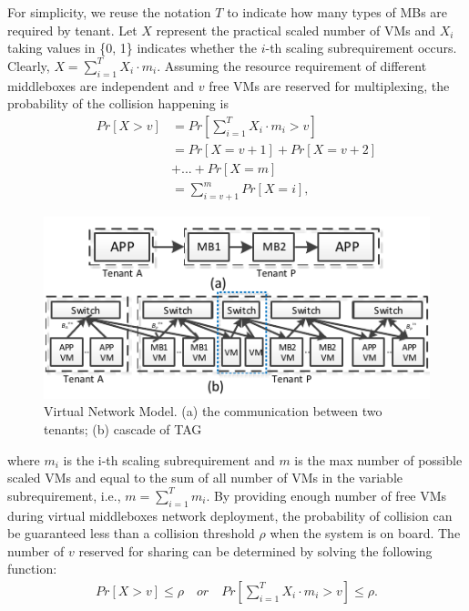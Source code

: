 \documentclass[review]{elsarticle}
\begin{document}
For simplicity, we reuse the notation $T$ to indicate how many types of MBs are required by tenant. Let $X$ represent the practical scaled  number of VMs and $X_{i}$ taking values in \{0, 1\} indicates whether the $i$-th scaling subrequirement occurs. Clearly, $X=\sum_{i=1}^{T}X_{i}\cdot m_{i}$. Assuming the resource requirement of different middleboxes are independent and $v$ free VMs are reserved for multiplexing, the probability of the collision happening is
\begin{equation} 
\begin{aligned}
Pr\left[X>v\right]
& = Pr\left[\sum_{i=1}^{T}X_{i}\cdot m_{i}>v\right]\\
& = Pr\left[X=v+1 \right] + Pr\left[X=v+2 \right]\\
& + ...+ Pr\left[X=m \right] \\
& = \sum_{i=v+1}^{m}Pr\left[X=i \right],
\end{aligned}
\end{equation}
\begin{figure}
	\centering
	\includegraphics[width=4.5in]{fig/scalability.pdf}
	\caption{Virtual Network Model. (a) the communication between two tenants; (b) cascade of TAG}
	\label{fig:scalability}
\end{figure}where $m_i$ is the i-th scaling subrequirement and $m$ is the max number of possible scaled VMs and equal to the sum of all number of VMs in the variable subrequirement, i.e., $m=\sum_{i=1}^{T} m_i$. 
By providing enough number of free VMs during virtual middleboxes network deployment, the probability of collision can be guaranteed less than a collision threshold $\rho$ when the system is on board. The number of $v$ reserved for sharing can be determined by solving the following function:
\begin{equation}\label{equ:collision}  
\begin{aligned} 
Pr\left[ X>v \right] \leq \rho \quad or	\quad Pr\left[ \sum_{i=1}^{T} X_{i}\cdot m_{i} > v \right] \leq \rho.
\end{aligned}
\end{equation}
\end{document}
